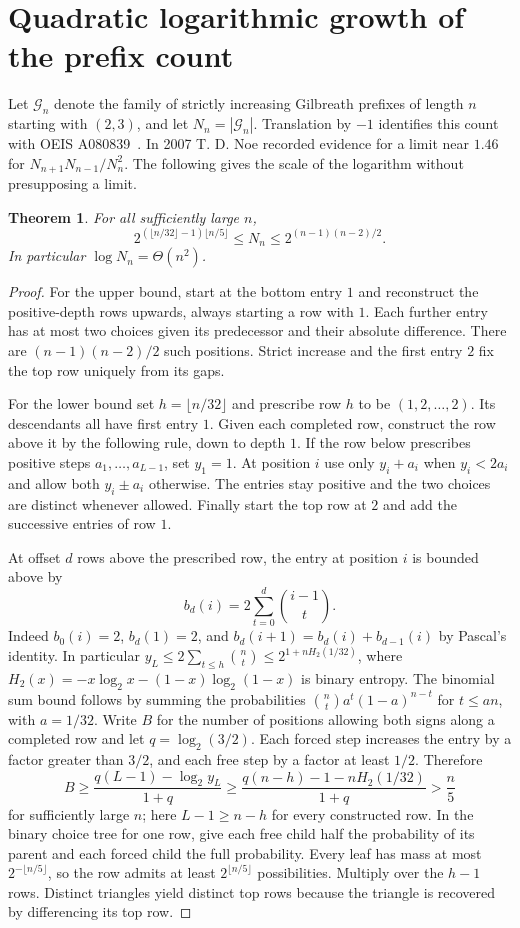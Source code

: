 \documentclass[11pt,a4paper]{article}
\newtheorem{theorem}{Theorem}[section]
\begin{document}
\section{Quadratic logarithmic growth of the prefix count}
Let $\mathcal G_n$ denote the family of strictly increasing Gilbreath prefixes of length $n$ starting with $(2,3)$, and let $N_n=|\mathcal G_n|$. Translation by $-1$ identifies this count with OEIS A080839~\cite{noe}. In 2007 T. D. Noe recorded evidence for a limit near $1.46$ for $N_{n+1}N_{n-1}/N_n^2$. The following gives the scale of the logarithm without presupposing a limit.

\begin{theorem}
For all sufficiently large $n$,
\[
 2^{(\lfloor n/32\rfloor-1)\lfloor n/5\rfloor}
 \le N_n\le 2^{(n-1)(n-2)/2}.
\]
In particular $\log N_n=\Theta(n^2)$.
\end{theorem}

\begin{proof}
For the upper bound, start at the bottom entry $1$ and reconstruct the positive-depth rows upwards, always starting a row with $1$. Each further entry has at most two choices given its predecessor and their absolute difference. There are $(n-1)(n-2)/2$ such positions. Strict increase and the first entry $2$ fix the top row uniquely from its gaps.

For the lower bound set $h=\lfloor n/32\rfloor$ and prescribe row $h$ to be $(1,2,\ldots,2)$. Its descendants all have first entry $1$. Given each completed row, construct the row above it by the following rule, down to depth $1$. If the row below prescribes positive steps $a_1,\ldots,a_{L-1}$, set $y_1=1$. At position $i$ use only $y_i+a_i$ when $y_i<2a_i$ and allow both $y_i\pm a_i$ otherwise. The entries stay positive and the two choices are distinct whenever allowed. Finally start the top row at $2$ and add the successive entries of row $1$.

At offset $d$ rows above the prescribed row, the entry at position $i$ is bounded above by
\[
 b_d(i)=2\sum_{t=0}^{d}\binom{i-1}{t}.
\]
Indeed $b_0(i)=2$, $b_d(1)=2$, and $b_d(i+1)=b_d(i)+b_{d-1}(i)$ by Pascal's identity. In particular $y_L\le 2\sum_{t\le h}\binom{n}{t}\le 2^{1+n H_2(1/32)}$, where $H_2(x)=-x\log_2 x-(1-x)\log_2(1-x)$ is binary entropy. The binomial sum bound follows by summing the probabilities $\binom nt a^t(1-a)^{n-t}$ for $t\le an$, with $a=1/32$. Write $B$ for the number of positions allowing both signs along a completed row and let $q=\log_2(3/2)$. Each forced step increases the entry by a factor greater than $3/2$, and each free step by a factor at least $1/2$. Therefore
\[
 B\ge\frac{q(L-1)-\log_2 y_L}{1+q}
 \ge\frac{q(n-h)-1-nH_2(1/32)}{1+q}>\frac n5
\]
for sufficiently large $n$; here $L-1\ge n-h$ for every constructed row. In the binary choice tree for one row, give each free child half the probability of its parent and each forced child the full probability. Every leaf has mass at most $2^{-\lfloor n/5\rfloor}$, so the row admits at least $2^{\lfloor n/5\rfloor}$ possibilities. Multiply over the $h-1$ rows. Distinct triangles yield distinct top rows because the triangle is recovered by differencing its top row.
\end{proof}
\end{document}
